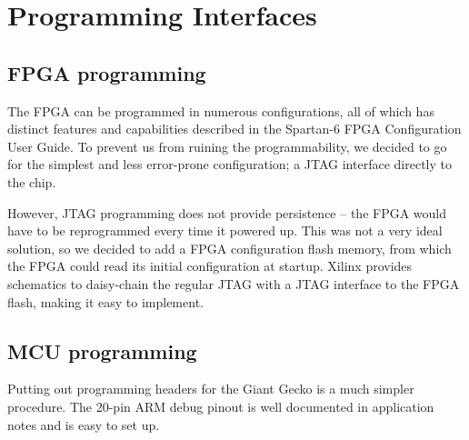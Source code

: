 \section{Programming Interfaces}

\subsection{FPGA programming}
The FPGA can be programmed in numerous configurations, all of which has distinct
features and capabilities described in the Spartan-6 FPGA Configuration User
Guide. To prevent us from ruining the programmability, we decided to go for the
simplest and less error-prone configuration; a JTAG interface directly to the
chip.

However, JTAG programming does not provide persistence -- the FPGA would
have to be reprogrammed every time it powered up. This was not a very ideal
solution, so we decided to add a FPGA configuration flash memory, from which
the FPGA could read its initial configuration at startup. Xilinx provides
schematics to daisy-chain  the regular JTAG with a
JTAG interface to the FPGA flash, making it easy to implement.

\subsection{MCU programming}
Putting out programming headers for the Giant Gecko is a much simpler procedure.
The 20-pin ARM debug pinout is well documented in application notes and is easy
to set up.

